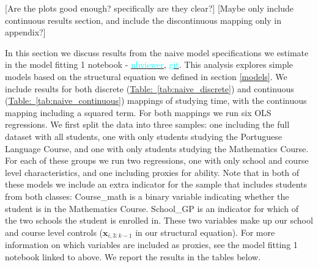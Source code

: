 \documentclass[12pt]{article}
\begin{document}
\textcolor{BrickRed}{[Are the plots good enough? specifically are they clear?]} \textcolor{BrickRed}{[Maybe only include continuous results section, and include the discontinuous mapping only in appendix?]}

In this section we discuss results from the naive model specifications we estimate in the model fitting 1 notebook -  \href{https://nbviewer.jupyter.org/github/nadavtadelis/Reproducible_Metrics/blob/master/model_fitting_1.ipynb}{\textcolor{cyan}{nbviewer}}, \href{https://github.com/nadavtadelis/Reproducible_Metrics/blob/master/model_fitting_1.ipynb}{\textcolor{cyan}{git}}. This analysis explores simple models based on the structural equation we defined in section \ref{models}. We include results for both discrete (\hyperref[tab:naive_discrete]{Table:~\ref*{tab:naive_discrete}}) and continuous (\hyperref[tab:naive_continuous]{Table:~\ref*{tab:naive_continuous}}) mappings of studying time, with the continuous mapping including a squared term. For both mappings we run six OLS regressions. We first split the data into three samples: one including the full dataset with all students, one with only students studying the Portuguese Language Course, and one with only students studying the Mathematics Course. For each of these groups we run two regressions, one with only school and course level characteristics, and one including proxies for ability. Note that in both of these models we include an extra indicator for the sample that includes students from both classes: Course\_math is a binary variable indicating whether the student is in the Mathematics Course. School\_GP is an indicator for which of the two schools the student is enrolled in. These two variables make up our school and course level controls ($\bm{x}_{i,3:k-1}$ in our structural equation). For more information on which variables are included as proxies, see the model fitting 1 notebook linked to above. We report the results in the tables below.
\end{document}
